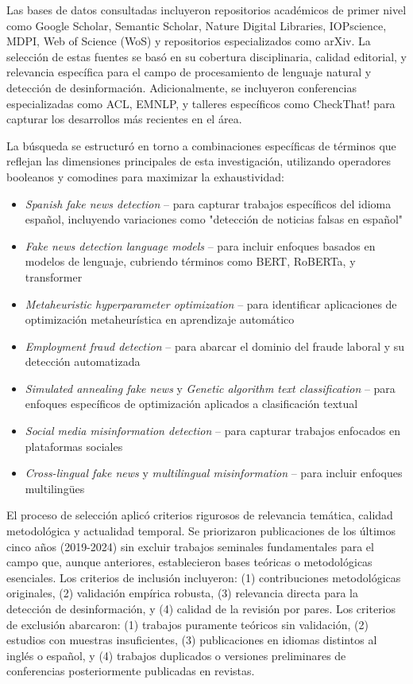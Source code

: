 Las bases de datos consultadas incluyeron repositorios académicos de primer nivel como Google Scholar, Semantic Scholar, Nature Digital Libraries, IOPscience, MDPI, Web of Science (WoS) y repositorios especializados como arXiv. La selección de estas fuentes se basó en su cobertura disciplinaria, calidad editorial, y relevancia específica para el campo de procesamiento de lenguaje natural y detección de desinformación. Adicionalmente, se incluyeron conferencias especializadas como ACL, EMNLP, y talleres específicos como CheckThat! para capturar los desarrollos más recientes en el área.

La búsqueda se estructuró en torno a combinaciones específicas de términos que reflejan las dimensiones principales de esta investigación, utilizando operadores booleanos y comodines para maximizar la exhaustividad:

\begin{itemize}
    \item \textit{Spanish fake news detection} -- para capturar trabajos específicos del idioma español, incluyendo variaciones como "detección de noticias falsas en español"
    \item \textit{Fake news detection language models} -- para incluir enfoques basados en modelos de lenguaje, cubriendo términos como BERT, RoBERTa, y transformer
    \item \textit{Metaheuristic hyperparameter optimization} -- para identificar aplicaciones de optimización metaheurística en aprendizaje automático
    \item \textit{Employment fraud detection} -- para abarcar el dominio del fraude laboral y su detección automatizada
    \item \textit{Simulated annealing fake news} y \textit{Genetic algorithm text classification} -- para enfoques específicos de optimización aplicados a clasificación textual
    \item \textit{Social media misinformation detection} -- para capturar trabajos enfocados en plataformas sociales
    \item \textit{Cross-lingual fake news} y \textit{multilingual misinformation} -- para incluir enfoques multilingües
\end{itemize}

El proceso de selección aplicó criterios rigurosos de relevancia temática, calidad metodológica y actualidad temporal. Se priorizaron publicaciones de los últimos cinco años (2019-2024) sin excluir trabajos seminales fundamentales para el campo que, aunque anteriores, establecieron bases teóricas o metodológicas esenciales. Los criterios de inclusión incluyeron: (1) contribuciones metodológicas originales, (2) validación empírica robusta, (3) relevancia directa para la detección de desinformación, y (4) calidad de la revisión por pares. Los criterios de exclusión abarcaron: (1) trabajos puramente teóricos sin validación, (2) estudios con muestras insuficientes, (3) publicaciones en idiomas distintos al inglés o español, y (4) trabajos duplicados o versiones preliminares de conferencias posteriormente publicadas en revistas.

